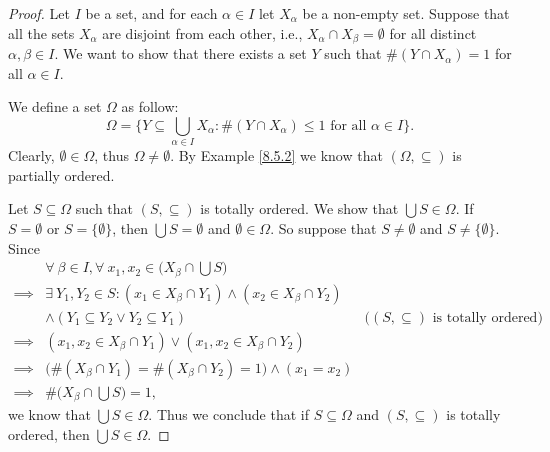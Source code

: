 \begin{proof}
    Let \(I\) be a set, and for each \(\alpha \in I\) let \(X_{\alpha}\) be a non-empty set.
    Suppose that all the sets \(X_{\alpha}\) are disjoint from each other, i.e., \(X_{\alpha} \cap X_{\beta} = \emptyset\) for all distinct \(\alpha, \beta \in I\).
    We want to show that there exists a set \(Y\) such that \(\#(Y \cap X_{\alpha}) = 1\) for all \(\alpha \in I\).

    We define a set \(\Omega\) as follow:
    \[
        \Omega = \{Y \subseteq \bigcup_{\alpha \in I} X_{\alpha} : \#(Y \cap X_{\alpha}) \leq 1 \text{ for all } \alpha \in I\}.
    \]
    Clearly, \(\emptyset \in \Omega\), thus \(\Omega \neq \emptyset\).
    By Example \ref{8.5.2} we know that \((\Omega, \subseteq)\) is partially ordered.

    Let \(S \subseteq \Omega\) such that \((S, \subseteq)\) is totally ordered.
    We show that \(\bigcup S \in \Omega\).
    If \(S = \emptyset\) or \(S = \{\emptyset\}\), then \(\bigcup S = \emptyset\) and \(\emptyset \in \Omega\).
    So suppose that \(S \neq \emptyset\) and \(S \neq \{\emptyset\}\).
    Since
    \begin{align*}
                 & \forall\ \beta \in I, \forall\ x_1, x_2 \in \Big(X_{\beta} \cap \bigcup S\Big)                                                             \\
        \implies & \exists\ Y_1, Y_2 \in S : (x_1 \in X_{\beta} \cap Y_1) \land (x_2 \in X_{\beta} \cap Y_2)                                                  \\
                 & \land (Y_1 \subseteq Y_2 \lor Y_2 \subseteq Y_1)                                          & \text{(\((S, \subseteq)\) is totally ordered)} \\
        \implies & (x_1, x_2 \in X_{\beta} \cap Y_1) \lor (x_1, x_2 \in X_{\beta} \cap Y_2)                                                                   \\
        \implies & \big(\#(X_{\beta} \cap Y_1) = \#(X_{\beta} \cap Y_2) = 1\big) \land (x_1 = x_2)                                                            \\
        \implies & \#\Big(X_{\beta} \cap \bigcup S\Big) = 1,
    \end{align*}
    we know that \(\bigcup S \in \Omega\).
    Thus we conclude that if \(S \subseteq \Omega\) and \((S, \subseteq)\) is totally ordered, then \(\bigcup S \in \Omega\).


\end{proof}
